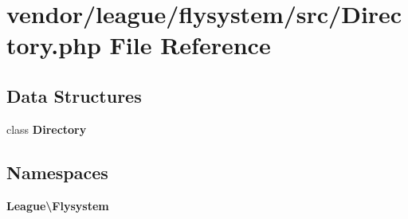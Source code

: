 \section{vendor/league/flysystem/src/\+Directory.php File Reference}
\label{league_2flysystem_2src_2_directory_8php}
\subsection*{Data Structures}
\begin{DoxyCompactItemize}
\item 
class {\bf Directory}
\end{DoxyCompactItemize}
\subsection*{Namespaces}
\begin{DoxyCompactItemize}
\item 
 {\bf League\textbackslash{}\+Flysystem}
\end{DoxyCompactItemize}
